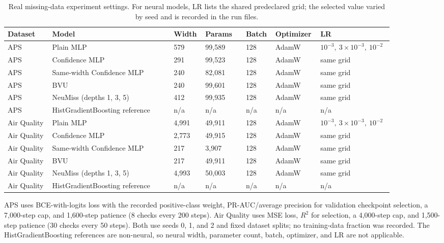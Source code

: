 \begin{table}[t]
\centering
\caption{Real missing-data experiment settings. For neural models, LR lists the shared predeclared grid; the selected value varied by seed and is recorded in the run files.}
\begin{tabular}{@{}p{0.11\linewidth}p{0.30\linewidth}p{0.07\linewidth}p{0.10\linewidth}p{0.07\linewidth}p{0.09\linewidth}p{0.14\linewidth}@{}}
\toprule
Dataset & Model & Width & Params & Batch & Optimizer & LR \\
\midrule
APS & Plain MLP & 579 & 99,589 & 128 & AdamW & $10^{-3},\ {3\!\times\!10^{-3}},\ 10^{-2}$ \\
APS & Confidence MLP & 291 & 99,523 & 128 & AdamW & same grid \\
APS & Same-width Confidence MLP & 240 & 82,081 & 128 & AdamW & same grid \\
APS & BVU & 240 & 99,601 & 128 & AdamW & same grid \\
APS & NeuMiss (depths 1, 3, 5) & 412 & 99,935 & 128 & AdamW & same grid \\
APS & HistGradientBoosting reference & n/a & n/a & n/a & n/a & n/a \\
Air Quality & Plain MLP & 4,991 & 49,911 & 128 & AdamW & $10^{-3},\ {3\!\times\!10^{-3}},\ 10^{-2}$ \\
Air Quality & Confidence MLP & 2,773 & 49,915 & 128 & AdamW & same grid \\
Air Quality & Same-width Confidence MLP & 217 & 3,907 & 128 & AdamW & same grid \\
Air Quality & BVU & 217 & 49,911 & 128 & AdamW & same grid \\
Air Quality & NeuMiss (depths 1, 3, 5) & 4,993 & 50,003 & 128 & AdamW & same grid \\
Air Quality & HistGradientBoosting reference & n/a & n/a & n/a & n/a & n/a \\
\bottomrule
\end{tabular}
\parbox{0.98\linewidth}{\footnotesize APS uses BCE-with-logits loss with the recorded positive-class weight, PR-AUC/average precision for validation checkpoint selection, a 7,000-step cap, and 1,600-step patience (8 checks every 200 steps). Air Quality uses MSE loss, $R^2$ for selection, a 4,000-step cap, and 1,500-step patience (30 checks every 50 steps). Both use seeds 0, 1, and 2 and fixed dataset splits; no training-data fraction was recorded. The HistGradientBoosting references are non-neural, so neural width, parameter count, batch, optimizer, and LR are not applicable.}
\end{table}
\endgroup
